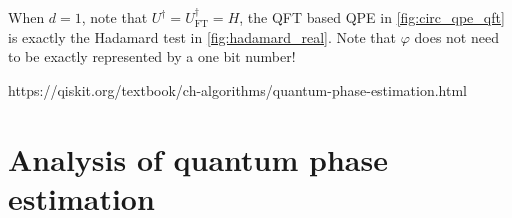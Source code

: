%

\begin{exam}
\label{exam:hadamard_qpe}
When $d=1$, note that $U^{\dag}=U^{\dag}_{\mathrm{FT}}=H$, the QFT based QPE in \cref{fig:circ_qpe_qft} is exactly the Hadamard test in \cref{fig:hadamard_real}. Note that $\varphi$ does not need to be exactly represented by a one bit number! 
\end{exam}

\begin{exam}
https://qiskit.org/textbook/ch-algorithms/quantum-phase-estimation.html
\end{exam}

\section{Analysis of quantum phase estimation}\label{sec:analysis_qpe}

